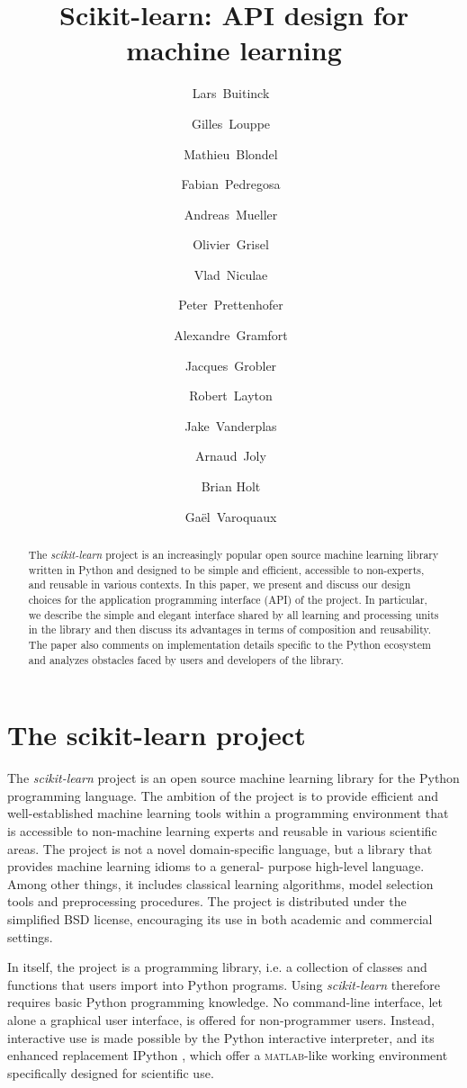 \documentclass{llncs}
\title{Scikit-learn: API design for machine learning}
\author{Lars~Buitinck~\inst{1,2} \and
        Gilles~Louppe~\inst{1,2} \and
        Mathieu~Blondel~\inst{1,2} \and
        Fabian~Pedregosa~\inst{2} \and
        Andreas~Mueller~\inst{2} \and
        Olivier~Grisel~\inst{2} \and
        Vlad~Niculae~\inst{2} \and
        Peter~Prettenhofer~\inst{2} \and
        Alexandre~Gramfort~\inst{2} \and
        Jacques~Grobler~\inst{2} \and
        Robert~Layton~\inst{2} \and
        Jake~Vanderplas~\inst{2} \and
        Arnaud~Joly~\inst{2} \and
        Brian Holt~\inst{2} \and
        Gaël~Varoquaux~\inst{2}}
\institute{Main authors of the present paper \and
           Core contributors to the project}
\newcommand{\sklearn}{\textit{scikit-learn}\xspace}
\begin{document}
\maketitle

\begin{abstract}
The \sklearn project is an increasingly popular open source machine learning
library written in Python and designed to be simple and efficient, accessible to
non-experts, and reusable in various contexts. In this paper, we present and
discuss our design choices for the application programming interface (API) of
the project. In particular, we describe the simple and elegant interface shared
by all learning and processing units in the library and then discuss its
advantages in terms of composition and reusability. The paper also comments on
implementation details specific to the Python ecosystem and analyzes obstacles
faced by users and developers of the library.
\end{abstract}

\section{The scikit-learn project}

The \sklearn project \citep{pedregosa2011} is an open source machine learning
library for the Python programming language. The ambition of the project is to
provide efficient and well-established machine learning tools within a
programming environment that is accessible to non-machine learning experts and
reusable in various scientific areas. The project is not a novel domain-specific
language, but a library that provides machine learning idioms to a general-
purpose high-level language. Among other things, it includes classical learning
algorithms, model selection tools and preprocessing procedures. The project is
distributed under the simplified BSD license, encouraging its use in both
academic and commercial settings.

In itself, the project is a programming library, i.e. a collection of classes
and functions that users import into Python programs. Using \sklearn therefore
requires basic Python programming knowledge. No command-line interface, let
alone a graphical user interface, is offered for non-programmer users. Instead,
interactive use is made possible by the Python interactive interpreter, and its
enhanced replacement IPython \citep{perez2007ipython}, which offer a
\textsc{matlab}-like working environment specifically designed for scientific
use.
\end{document}
